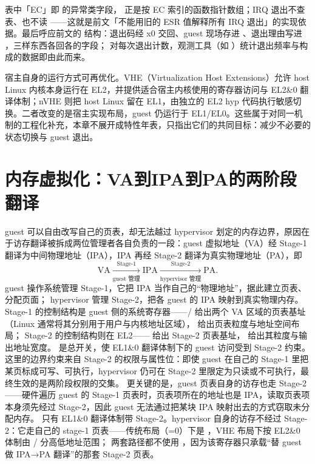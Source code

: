 表中「EC」即  的异常类字段， 正是按 EC 索引的函数指针数组；IRQ 退出不查表、也不读 ——这就是前文「不能用旧的 ESR 值解释所有 IRQ 退出」的实现依据。最后呼应前文的  结构：退出码经 x0 交回、guest 现场存进 、退出理由写进 ，三样东西各回各的字段； 对每次退出计数，观测工具（如 ）统计退出频率与构成的数据即由此而来。

宿主自身的运行方式可再优化。VHE（Virtualization Host Extensions）允许 host Linux 内核本身运行在 EL2，并提供适合宿主内核使用的寄存器访问与 EL2\&0 翻译体制；nVHE 则把 host Linux 留在 EL1，由独立的 EL2 hyp 代码执行敏感切换。二者改变的是宿主实现布局，guest 仍运行于 EL1/EL0。这些属于对同一机制的工程化补充，本章不展开成特性年表，只指出它们的共同目标：减少不必要的状态切换与 guest 退出\cite{source4,source5}。

\section{内存虚拟化：VA到IPA到PA的两阶段翻译}\label{sec:hardware-mem}

guest 可以自由改写自己的页表，却无法越过 hypervisor 划定的内存边界，原因在于访存翻译被拆成两位管理者各自负责的一段：guest 虚拟地址（VA）经 Stage-1 翻译为中间物理地址（IPA），IPA 再经 Stage-2 翻译为真实物理地址（PA），即
\begin{equation}
\mathrm{VA}\xrightarrow[\text{guest 管理}]{\text{Stage-1}}\mathrm{IPA}
\xrightarrow[\text{hypervisor 管理}]{\text{Stage-2}}\mathrm{PA}.
\label{eq:arm-two-stage}
\end{equation}
guest 操作系统管理 Stage-1，它把 IPA 当作自己的“物理地址”，据此建立页表、分配页面；
hypervisor 管理 Stage-2，把各 guest 的 IPA 映射到真实物理内存\cite{source4}。
Stage-1 的控制结构是 guest 侧的系统寄存器——/ 给出两个 VA 区域的页表基址（Linux 通常将其分别用于用户与内核地址区域）， 给出页表粒度与地址空间布局；
Stage-2 的控制结构则在 EL2—— 给出 Stage-2 页表基址， 给出其粒度与输出地址宽度。
 是总开关，使 EL1\&0 翻译体制下的 guest 访问受到 Stage-2 约束。
这里的边界约束来自 Stage-2 的权限与属性位：即使 guest 在自己的 Stage-1 里把某页标成可写、可执行，hypervisor 仍可在 Stage-2 里限定为只读或不可执行，最终生效的是两阶段权限的交集。
更关键的是，guest 页表自身的访存也走 Stage-2——硬件遍历 guest 的 Stage-1 页表时，页表项所在的地址也是 IPA，读取页表项本身须先经过 Stage-2，因此 guest 无法通过把某块 IPA 映射出去的方式窃取未分配内存。
只有 EL1\&0 翻译体制带 Stage-2。hypervisor 自身的访存不经过 Stage-2：它走自己的 stage-1 页表——传统布局（=0）下是 ，VHE 布局下按 EL2\&0 体制由 / 分高低地址范围；
两套路径都不使用 ，因为该寄存器只承载“替 guest 做 IPA→PA 翻译”的那套 Stage-2 页表\cite{source4}。

